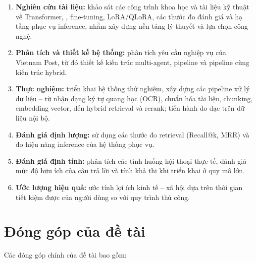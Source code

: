 \begin{enumerate}
  \item \textbf{Nghiên cứu tài liệu:} khảo sát các công trình khoa học và tài liệu kỹ thuật
  về Transformer, \rag, fine-tuning, LoRA/QLoRA, các thước đo đánh giá và hạ tầng phục vụ
  inference, nhằm xây dựng nền tảng lý thuyết và lựa chọn công nghệ.
  \item \textbf{Phân tích và thiết kế hệ thống:} phân tích yêu cầu nghiệp vụ của Vietnam Post,
  từ đó thiết kế kiến trúc multi-agent, pipeline \rag{} và pipeline \ft{} cùng kiến trúc hybrid.
  \item \textbf{Thực nghiệm:} triển khai hệ thống thử nghiệm, xây dựng các pipeline xử lý
  dữ liệu -- từ nhận dạng ký tự quang học (OCR), chuẩn hóa tài liệu, chunking, embedding
  vector, đến hybrid retrieval và rerank; tiến hành đo đạc trên dữ liệu nội bộ.
  \item \textbf{Đánh giá định lượng:} sử dụng các thước đo retrieval (Recall@k, MRR) và đo
  hiệu năng inference của hệ thống phục vụ.
  \item \textbf{Đánh giá định tính:} phân tích các tình huống hội thoại thực tế, đánh giá
  mức độ hữu ích của câu trả lời và tính khả thi khi triển khai ở quy mô lớn.
  \item \textbf{Ước lượng hiệu quả:} ước tính lợi ích kinh tế -- xã hội dựa trên thời gian
  tiết kiệm được của người dùng so với quy trình thủ công.
\end{enumerate}

\section{Đóng góp của đề tài}

Các đóng góp chính của đề tài bao gồm:


